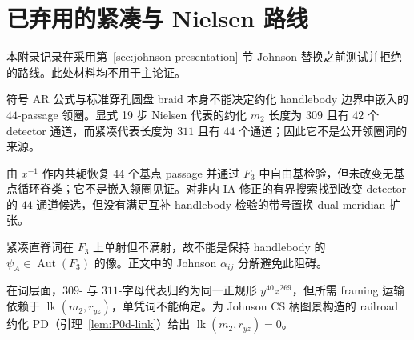 \section{已弃用的紧凑与 Nielsen 路线}\label{app:retired-routes}

本附录记录在采用第~\ref{sec:johnson-presentation} 节 Johnson 替换之前测试并拒绝的路线。此处材料均不用于主论证。

符号 AR 公式与标准穿孔圆盘 braid 本身不能决定约化 handlebody 边界中嵌入的 $44$-passage 领圈。显式 19 步 Nielsen 代表的约化 $m_2$ 长度为 $309$ 且有 $42$ 个 detector 通道，而紧凑代表长度为 $311$ 且有 $44$ 个通道；因此它不是公开领圈词的来源。

由 $x^{-1}$ 作内共轭恢复 $44$ 个基点 passage 并通过 $F_3$ 中自由基检验，但未改变无基点循环脊类；它不是嵌入领圈见证。对非内 IA 修正的有界搜索找到改变 detector 的 $44$-通道候选，但没有满足互补 handlebody 检验的带号置换 dual-meridian 扩张。

紧凑直脊词在 $F_3$ 上单射但不满射，故不能是保持 handlebody 的 $\psi_A\in\operatorname{Aut}(F_3)$ 的像。正文中的 Johnson $\alpha_{ij}$ 分解避免此阻碍。

在词层面，$309$- 与 $311$-字母代表归约为同一正规形 $y^{40}z^{269}$，但所需 framing 运输依赖于 $\operatorname{lk}(m_2,r_{yz})$，单凭词不能确定。为 Johnson CS 柄图景构造的 railroad 约化 PD（引理~\ref{lem:P0d-link}）给出 $\operatorname{lk}(m_2,r_{yz})=0$。
